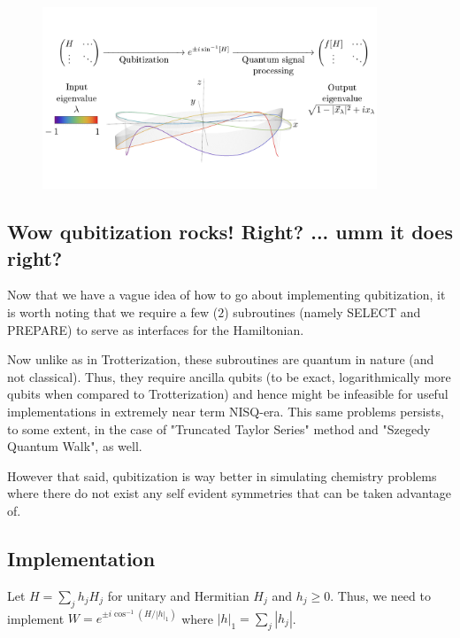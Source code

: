 \documentclass[
10pt, %
a4paper, %
oneside, %
headinclude,footinclude, %
BCOR5mm, %
]{scrartcl}
\begin{document}
\begin{figure}[H]
    \centering
    \includegraphics[width=100mm]{images/qubitization.png}
\end{figure}

\subsection{Wow qubitization rocks! Right? ... umm it does right?}
Now that we have a vague idea of how to go about implementing qubitization, it is worth noting that we require a few ($2$) subroutines (namely SELECT and PREPARE) to serve as interfaces for the Hamiltonian.\newline

Now unlike as in Trotterization, these subroutines are quantum in nature (and not classical). Thus, they require ancilla qubits (to be exact, logarithmically more qubits when compared to Trotterization) and hence might be infeasible for useful implementations in extremely near term NISQ-era. This same problems persists, to some extent, in the case of "Truncated Taylor Series" method and "Szegedy Quantum Walk", as well.\newline

However that said, qubitization is way better in simulating chemistry problems where there do not exist any self evident symmetries that can be taken advantage of.

\subsection{Implementation}
Let $H = \sum_j h_jH_j$ for unitary and Hermitian $H_j$ and $h_j \geq 0$. Thus, we need to implement $W = e^{\pm i \cos^{-1} (H/|h|_1)}$ where $|h|_1 = \sum_j |h_j|$.\newline
\end{document}
